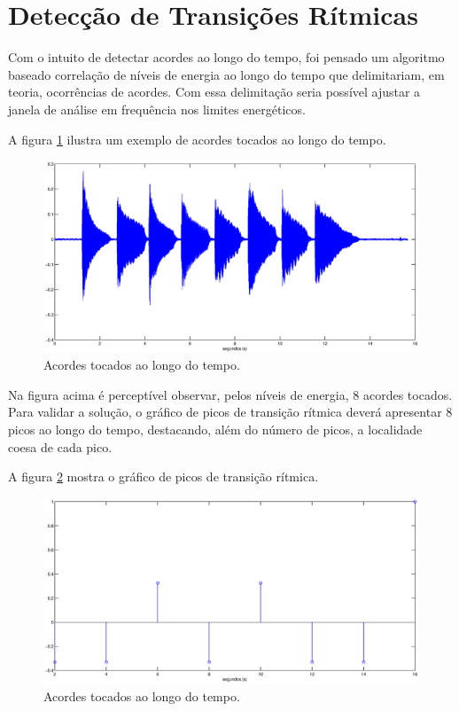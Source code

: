 \section{Detecção de Transições Rítmicas}
Com o intuito de detectar acordes ao longo do tempo, foi pensado um algoritmo baseado correlação de níveis de energia ao longo do tempo que delimitariam, em teoria, ocorrências de acordes. Com essa delimitação seria possível ajustar a janela de análise em frequência nos limites energéticos.

A figura \ref{fig:deteccao_ritmica_1} ilustra um exemplo de acordes tocados ao longo do tempo. 

\begin{figure}[h]
  \centering
    \includegraphics[keepaspectratio=true,scale=0.49]{figuras/deteccao_ritmica_1.eps}
  \caption{Acordes tocados ao longo do tempo.}
  \label{fig:deteccao_ritmica_1}
\end{figure}

Na figura acima é perceptível observar, pelos níveis de energia, 8 acordes tocados. Para validar a solução, o gráfico de picos de transição rítmica deverá apresentar 8 picos ao longo do tempo, destacando, além do número de picos, a localidade coesa de cada pico.

A figura \ref{fig:deteccao_ritmica_2} mostra o gráfico de picos de transição rítmica.

\begin{figure}[h]
  \centering
    \includegraphics[keepaspectratio=true,scale=0.49]{figuras/deteccao_ritmica_2.eps}
  \caption{Acordes tocados ao longo do tempo.}
  \label{fig:deteccao_ritmica_2}
\end{figure}

